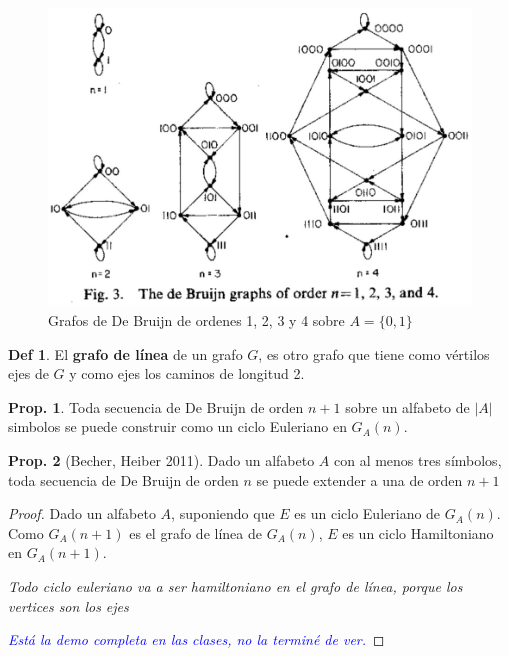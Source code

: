 \documentclass{report}
\theoremstyle{definition} %
\newtheorem{proposition}{Prop.}
\newtheorem*{definition*}{Def}
\begin{document}
\begin{figure}[H]
    \centering
    \includegraphics[scale=0.3]{img/2_de_brujin_ord_1234.png}
    \caption{Grafos de De Bruijn de ordenes 1, 2, 3 y 4 sobre $A = \{0, 1\}$}
\end{figure}

\begin{definition*}
    El \textbf{grafo de línea} de un grafo $G$, es otro grafo que tiene como
    vértilos ejes de $G$ y como ejes los caminos de longitud 2.
\end{definition*}


\begin{proposition}
    Toda secuencia de De Bruijn de orden $n+1$ sobre un alfabeto de $|A|$
    simbolos se puede construir como un ciclo Euleriano en $G_A(n)$.
\end{proposition}

\begin{proposition}[Becher, Heiber 2011]\label{prop:de-brujin-extend}
    Dado un alfabeto $A$ con al menos tres símbolos, toda secuencia de De
    Bruijn de orden $n$ se puede extender a una de orden $n + 1$
\end{proposition}
\begin{proof}
    Dado un alfabeto $A$, suponiendo que $E$ es un ciclo Euleriano de $G_A(n)$.
    Como $G_A(n + 1)$ es el grafo de línea de $G_A(n)$, $E$ es un ciclo
    Hamiltoniano en $G_A(n+1)$.

    \textit{Todo ciclo euleriano va a ser hamiltoniano en el grafo de línea, 
    porque los vertices son los ejes}
    
    \textit{\textcolor{blue}{Está la demo completa en las clases, no la terminé
    de ver.}}

\end{proof}
\end{document}

